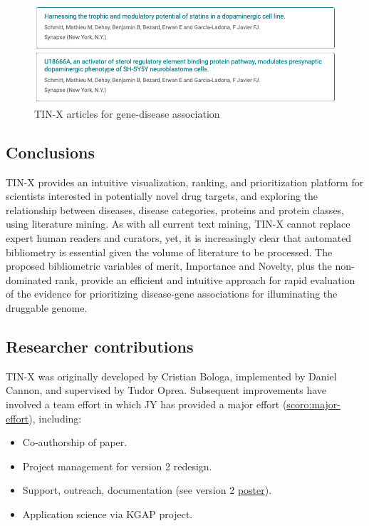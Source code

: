 \begin{figure}
    \centering
    \includegraphics[width=\linewidth]{figures/tinx/TINX_SYNRG3articles_rev2.png}
    \caption{TIN-X articles for gene-disease association}
    \label{fig:tinx_02}
\end{figure}

\subsection{Conclusions}

TIN-X provides an intuitive visualization, ranking, and prioritization platform for scientists interested in potentially novel drug targets, and exploring the relationship between diseases, disease categories, proteins and protein classes, using literature mining.  As with all current text mining, TIN-X cannot replace expert human readers and curators, yet, it is increasingly clear that automated bibliometry is essential given the volume of literature to be processed. The proposed bibliometric variables of merit, Importance and Novelty, plus the non-dominated rank, provide an efficient and intuitive approach for rapid evaluation of the evidence for prioritizing disease-gene associations for illuminating the druggable genome. 

\subsection{Researcher contributions}

TIN-X was originally developed by Cristian Bologa, implemented by Daniel Cannon, and supervised by Tudor Oprea. Subsequent improvements have involved a team effort in which JY has provided a major effort (\href{http://purl.org/spar/scoro/major-effort}{scoro:major-effort}), including:

\begin{itemize}[topsep=0pt,itemsep=0pt,partopsep=0pt,parsep=0pt]
    \item Co-authorship of paper.
    \item Project management for version 2 redesign.
    \item Support, outreach, documentation (see version 2 \href{https://zenodo.org/record/5038628}{poster}).
    \item Application science via KGAP project.
\end{itemize}
